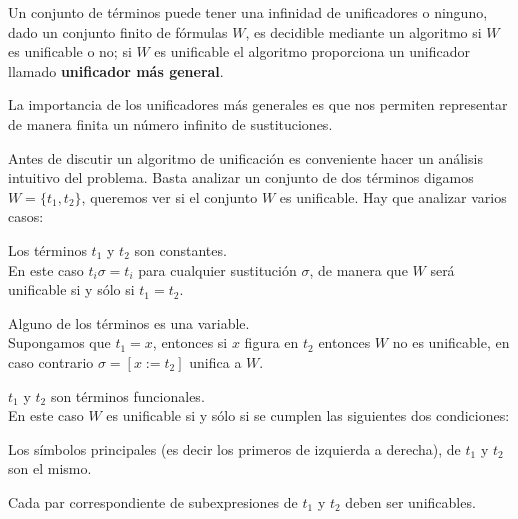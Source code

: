 \documentclass[11pt,letterpaper]{article}
\begin{document}


\ejem{Sea $W=\{g(x,f(y)),g(x,f(x)),g(u,v)\}$ un conjunto de términos, entonces 
la sustituci\'on~$\sigma=[x:=a,\,\allowbreak y:=a,\,u:=a,\,v:=f(a)\}$ es un 
unificador de $W$ ya que $W\sigma=\{g(a,f(a))\}$
}

Un conjunto de términos puede tener una infinidad de unificadores o
ninguno, dado un conjunto finito de f\'ormulas $W$, es decidible mediante
un algoritmo si $W$ es unificable o no; si $W$ es
unificable el algoritmo proporciona un unificador llamado
\textbf{unificador m\'as general}.

La importancia de los unificadores m\'as generales es que nos permiten
representar de manera finita un n\'umero infinito de sustituciones.


\vspace*{20pt}

Antes de discutir un algoritmo de unificación es conveniente hacer un 
an\'alisis intuitivo del problema. Basta analizar un conjunto de dos
términos digamos $W=\{t_1,t_2\}$, queremos ver si el
conjunto $W$ es unificable. 
Hay que analizar varios casos:
\be
 \item Los términos $t_1$ y $t_2$ son constantes. \\
  En este caso $t_i\sigma=t_i$ para cualquier sustituci\'on $\sigma$, de manera 
  que $W$ ser\'a unificable si y sólo si $t_1=t_2$.
 \item Alguno de los términos es una variable. \\
  Supongamos que $t_1=x$, entonces si $x$ figura en $t_2$ entonces $W$ no es 
  unificable, en caso contrario $\sigma=[x:=t_2]$ unifica a $W$. 
 \item $t_1$ y $t_2$ son términos funcionales. \\
  En este caso $W$ es unificable si y sólo si se cumplen las siguientes dos 
  condiciones:
  \bi
   \item Los símbolos principales (es decir los primeros de izquierda a 
    derecha), de $t_1$ y $t_2$ son el mismo.  
   \item Cada par correspondiente de subexpresiones de $t_1$ y $t_2$ deben ser
    unificables. 
  \ei
\ee
\end{document}

